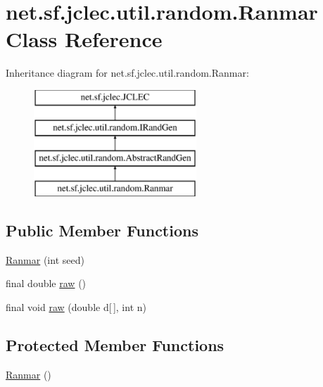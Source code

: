 \hypertarget{classnet_1_1sf_1_1jclec_1_1util_1_1random_1_1_ranmar}{\section{net.\-sf.\-jclec.\-util.\-random.\-Ranmar Class Reference}
\label{classnet_1_1sf_1_1jclec_1_1util_1_1random_1_1_ranmar}
}
Inheritance diagram for net.\-sf.\-jclec.\-util.\-random.\-Ranmar\-:\begin{figure}[H]
\begin{center}
\leavevmode
\includegraphics[height=4.000000cm]{classnet_1_1sf_1_1jclec_1_1util_1_1random_1_1_ranmar}
\end{center}
\end{figure}
\subsection*{Public Member Functions}
\begin{DoxyCompactItemize}
\item 
\hyperlink{classnet_1_1sf_1_1jclec_1_1util_1_1random_1_1_ranmar_ab7e3d8c3e5f201860480e51a3bd2e9db}{Ranmar} (int seed)
\item 
final double \hyperlink{classnet_1_1sf_1_1jclec_1_1util_1_1random_1_1_ranmar_a2e6121c577a4fddedfa776fe33125083}{raw} ()
\item 
final void \hyperlink{classnet_1_1sf_1_1jclec_1_1util_1_1random_1_1_ranmar_a68a033084f274508dbf6ad52c0ff2158}{raw} (double d\mbox{[}$\,$\mbox{]}, int n)
\end{DoxyCompactItemize}
\subsection*{Protected Member Functions}
\begin{DoxyCompactItemize}
\item 
\hyperlink{classnet_1_1sf_1_1jclec_1_1util_1_1random_1_1_ranmar_a1af117546d76d350990a852b76ae6391}{Ranmar} ()
\end{DoxyCompactItemize}
